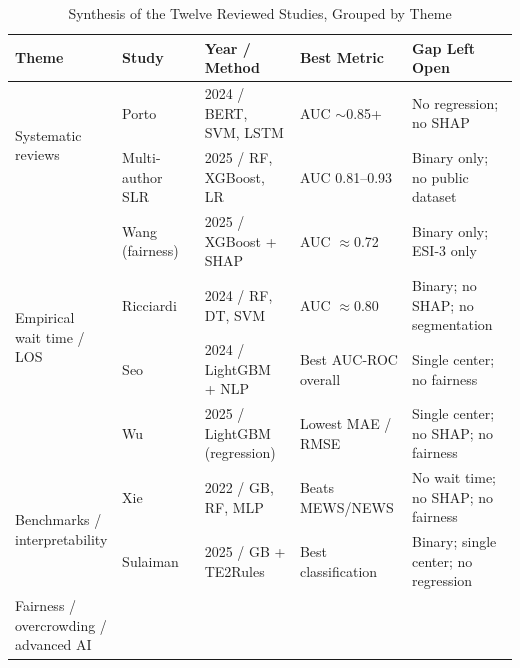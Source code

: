 \documentclass[conference]{IEEEtran}
\begin{document}
\setlength{\textfloatsep}{6pt plus 1pt minus 1pt}
\setlength{\floatsep}{6pt plus 1pt minus 1pt}
\setlength{\intextsep}{6pt plus 1pt minus 1pt}

\begin{table}[!t]
\caption{Synthesis of the Twelve Reviewed Studies, Grouped by Theme}
\label{tab:summary}
\renewcommand{\arraystretch}{1.2}
\centering
\begin{tabular}{p{2.0cm}p{3.5cm}p{2.4cm}p{2.6cm}p{4.2cm}}
\toprule
\textbf{Theme} & \textbf{Study} & \textbf{Year / Method} & \textbf{Best Metric} & \textbf{Gap Left Open} \\
\midrule
\multirow{2}{*}{\parbox{2.0cm}{Systematic\\reviews}}
 & Porto~\cite{porto2024}             & 2024 / BERT, SVM, LSTM         & AUC $\sim$0.85+      & No regression; no SHAP \\
 & Multi-author SLR~\cite{slr2025}     & 2025 / RF, XGBoost, LR         & AUC 0.81--0.93       & Binary only; no public dataset \\
\midrule
\multirow{4}{*}{\parbox{2.0cm}{Empirical\\wait time / LOS}}
 & Wang (fairness)~\cite{wang2025fair} & 2025 / XGBoost + SHAP          & AUC $\approx$0.72    & Binary only; ESI-3 only \\
 & Ricciardi~\cite{ricciardi2024}      & 2024 / RF, DT, SVM             & AUC $\approx$0.80    & Binary; no SHAP; no segmentation \\
 & Seo~\cite{seo2024}                  & 2024 / LightGBM + NLP          & Best AUC-ROC overall & Single center; no fairness \\
 & Wu~\cite{wu2025}                    & 2025 / LightGBM (regression)   & Lowest MAE / RMSE    & Single center; no SHAP; no fairness \\
\midrule
\multirow{2}{*}{\parbox{2.0cm}{Benchmarks /\\interpretability}}
 & Xie~\cite{xie2022}                  & 2022 / GB, RF, MLP             & Beats MEWS/NEWS      & No wait time; no SHAP; no fairness \\
 & Sulaiman~\cite{sulaiman2025}        & 2025 / GB + TE2Rules           & Best classification  & Binary; single center; no regression \\
\midrule
\multirow{3}{*}{\parbox{2.0cm}{Fairness /\\overcrowding /\\advanced AI}}

\end{tabular}
\end{table}
\end{document}
